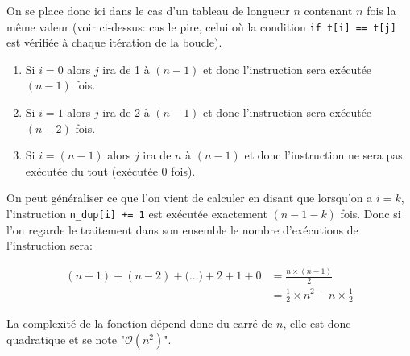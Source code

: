 \documentclass[12pt]{article}
\begin{document}
\begin{MaReponse}
\begin{alphenum}
			\item On se place donc ici dans le cas d'un tableau de longueur $n$ contenant $n$ fois la même valeur (voir ci-dessus: cas le pire, celui où la condition \texttt{if t[i] == t[j]} est vérifiée à chaque itération de la boucle). 
			
			\begin{enumerate}
				\item Si $i = 0$ alors $j$ ira de 1 à $(n-1)$ et donc l'instruction sera exécutée $(n-1)$ fois.
				\item Si $i = 1$ alors $j$ ira de 2 à $(n-1)$ et donc l'instruction sera exécutée $(n-2)$ fois.
				\item Si $i = (n - 1)$ alors $j$ ira de $n$ à $(n-1)$ et donc l'instruction ne sera pas exécutée du tout (exécutée 0 fois).
			\end{enumerate}
			
			\item On peut généraliser ce que l'on vient de calculer en disant que lorsqu'on a $i = k$, l'instruction \texttt{n\_dup[i] += 1} est exécutée exactement $(n - 1 - k)$ fois. Donc si l'on regarde le traitement dans son ensemble le nombre d'exécutions de l'instruction sera:
			
			\begin{align*}
				(n - 1) + (n - 2) + \text{(...)} + 2 + 1 + 0 &= \frac{n\times (n-1)}{2} \\
				&= \frac{1}{2} \times n^2 - n \times \frac{1}{2}
			\end{align*}
			
			La complexité de la fonction dépend donc du carré de $n$, elle est donc quadratique et se note "$\mathcal{O}(n^2)$".
		\end{alphenum}
	\end{MaReponse}
	
\end{document}
